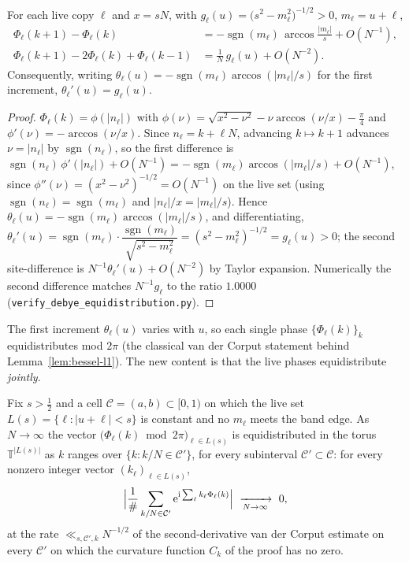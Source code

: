 \begin{lemma}\label{lem:debye-incr}
For each live copy $\ell$ and $x=sN$, with $g_\ell(u)=\bigl(s^2-m_\ell^2\bigr)^{-1/2}>0$, $m_\ell=u+\ell$,
\begin{align*}
  \Phi_\ell(k+1)-\Phi_\ell(k)&=-\operatorname{sgn}(m_\ell)\,\arccos\tfrac{|m_\ell|}{s}+O(N^{-1}),\\
  \Phi_\ell(k+1)-2\Phi_\ell(k)+\Phi_\ell(k-1)&=\tfrac1N\,g_\ell(u)+O(N^{-2}).
\end{align*}
Consequently, writing
$\theta_\ell(u)=-\operatorname{sgn}(m_\ell)\arccos(|m_\ell|/s)$ for the first increment,
$\theta_\ell'(u)=g_\ell(u)$.
\end{lemma}

\begin{proof}
$\Phi_\ell(k)=\phi(|n_\ell|)$ with $\phi(\nu)=\sqrt{x^2-\nu^2}-\nu\arccos(\nu/x)-\tfrac\pi4$ and
$\phi'(\nu)=-\arccos(\nu/x)$. Since $n_\ell=k+\ell N$, advancing $k\mapsto k+1$ advances $\nu=|n_\ell|$ by
$\operatorname{sgn}(n_\ell)$, so the first difference is $\operatorname{sgn}(n_\ell)\,\phi'(|n_\ell|)+O(N^{-1})
=-\operatorname{sgn}(m_\ell)\arccos(|m_\ell|/s)+O(N^{-1})$, since $\phi''(\nu)=(x^2-\nu^2)^{-1/2}=O(N^{-1})$ on the
live set (using $\operatorname{sgn}(n_\ell)=\operatorname{sgn}(m_\ell)$ and
$|n_\ell|/x=|m_\ell|/s$). Hence $\theta_\ell(u)=-\operatorname{sgn}(m_\ell)\arccos(|m_\ell|/s)$, and
differentiating, $\theta_\ell'(u)=\operatorname{sgn}(m_\ell)\cdot\dfrac{\operatorname{sgn}(m_\ell)}{\sqrt{s^2-m_\ell^2}}
=(s^2-m_\ell^2)^{-1/2}=g_\ell(u)>0$; the second site-difference is $N^{-1}\theta_\ell'(u)+O(N^{-2})$ by Taylor
expansion. Numerically the second difference matches $N^{-1}g_\ell$ to the ratio $1.0000$
(\texttt{verify\_debye\_equidistribution.py}).
\end{proof}

The first increment $\theta_\ell(u)$ varies with $u$, so each single phase $\{\Phi_\ell(k)\}_k$
equidistributes mod $2\pi$ (the classical van der Corput statement behind Lemma~\ref{lem:bessel-l1}). The new
content is that the live phases equidistribute \emph{jointly}.

\begin{theorem}\label{thm:joint-equi}
Fix $s>\tfrac12$ and a cell $\mathcal C=(a,b)\subset[0,1)$ on which the live set $L(s)=\{\ell:|u+\ell|<s\}$ is
constant and no $m_\ell$ meets the band edge. As $N\to\infty$ the vector
$\bigl(\Phi_\ell(k)\bmod2\pi\bigr)_{\ell\in L(s)}$ is equidistributed in the torus $\mathbb T^{|L(s)|}$ as $k$
ranges over $\{k:k/N\in\mathcal C'\}$, for every subinterval $\mathcal C'\subset\mathcal C$: for every nonzero
integer vector $(k_\ell)_{\ell\in L(s)}$,
\begin{equation}\label{eq:joint-weyl}
  \Bigl|\frac1{\#}\sum_{k/N\in\mathcal C'}\mathrm{e}^{\mathrm i\sum_\ell k_\ell\Phi_\ell(k)}\Bigr|
  \ \xrightarrow[N\to\infty]{}\ 0,
\end{equation}
at the rate $\ll_{s,\mathcal C',k}N^{-1/2}$ of the second-derivative van der Corput estimate on every
$\mathcal C'$ on which the curvature function $C_k$ of the proof has no zero.
\end{theorem}

